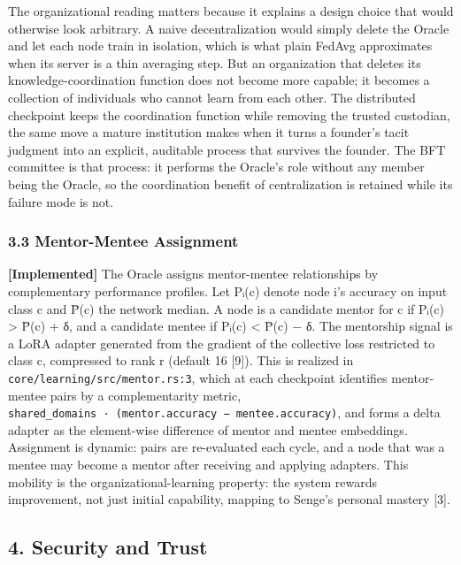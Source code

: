 The organizational reading matters because it explains a design choice
that would otherwise look arbitrary. A naive decentralization would
simply delete the Oracle and let each node train in isolation, which is
what plain FedAvg approximates when its server is a thin averaging step.
But an organization that deletes its knowledge-coordination function
does not become more capable; it becomes a collection of individuals who
cannot learn from each other. The distributed checkpoint keeps the
coordination function while removing the trusted custodian, the same
move a mature institution makes when it turns a founder's tacit judgment
into an explicit, auditable process that survives the founder. The BFT
committee is that process: it performs the Oracle's role without any
member being the Oracle, so the coordination benefit of centralization
is retained while its failure mode is not.

\subsubsection{3.3 Mentor-Mentee
Assignment}\label{mentor-mentee-assignment}

\textbf{{[}Implemented{]}} The Oracle assigns mentor-mentee
relationships by complementary performance profiles. Let Pᵢ(c) denote
node i's accuracy on input class c and P̄(c) the network median. A node
is a candidate mentor for c if Pᵢ(c) \textgreater{} P̄(c) + δ, and a
candidate mentee if Pᵢ(c) \textless{} P̄(c) − δ. The mentorship signal is
a LoRA adapter generated from the gradient of the collective loss
restricted to class c, compressed to rank r (default 16 {[}9{]}). This
is realized in \texttt{core/learning/src/mentor.rs:3}, which at each
checkpoint identifies mentor-mentee pairs by a complementarity metric,
\texttt{\textbar{}shared\_domains\textbar{}\ ·\ (mentor.accuracy\ −\ mentee.accuracy)},
and forms a delta adapter as the element-wise difference of mentor and
mentee embeddings. Assignment is dynamic: pairs are re-evaluated each
cycle, and a node that was a mentee may become a mentor after receiving
and applying adapters. This mobility is the organizational-learning
property: the system rewards improvement, not just initial capability,
mapping to Senge's personal mastery {[}3{]}.

\subsection{4. Security and Trust}\label{security-and-trust}

